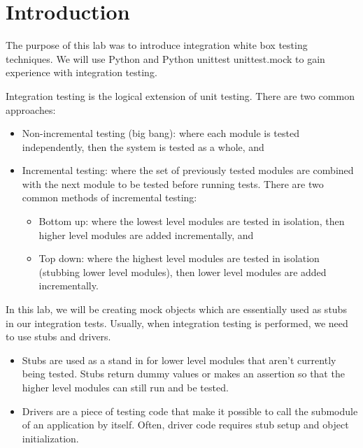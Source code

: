 \documentclass[12pt, letterpaper, titlepage]{article}
\title{\textbf{\Huge{
    \begin{center}
        ECE 322 Lab Report \#5
    \end{center}
}}}
\author{
\B enjamin Kong \\
1573684 \\
}
\begin{document}
 
\onehalfspacing

\maketitle
\newpage

\section*{Introduction}
The purpose of this lab was to introduce integration white box testing techniques. We will use Python and Python unittest unittest.mock to gain experience with integration testing.

Integration testing is the logical extension of unit testing. There are two common approaches:
\begin{itemize}
    \item Non-incremental testing (big bang): where each module is tested independently, then the system is tested as a whole, and
    \item Incremental testing: where the set of previously tested modules are combined with the next module to be tested before running tests. There are two common methods of incremental testing:
    \begin{itemize}
        \item Bottom up: where the lowest level modules are tested in isolation, then higher level modules are added incrementally, and
        \item Top down: where the highest level modules are tested in isolation (stubbing lower level modules), then lower level modules are added incrementally.
    \end{itemize}
\end{itemize}

In this lab, we will be creating mock objects which are essentially used as stubs in our integration tests. Usually, when integration testing is performed, we need to use stubs and drivers.
\begin{itemize}
    \item Stubs are used as a stand in for lower level modules that aren't currently being tested. Stubs return dummy values or makes an assertion so that the higher level modules can still run and be tested.
    \item Drivers are a piece of testing code that make it possible to call the submodule of an application by itself. Often, driver code requires stub setup and object initialization. 
\end{itemize}
\end{document}
